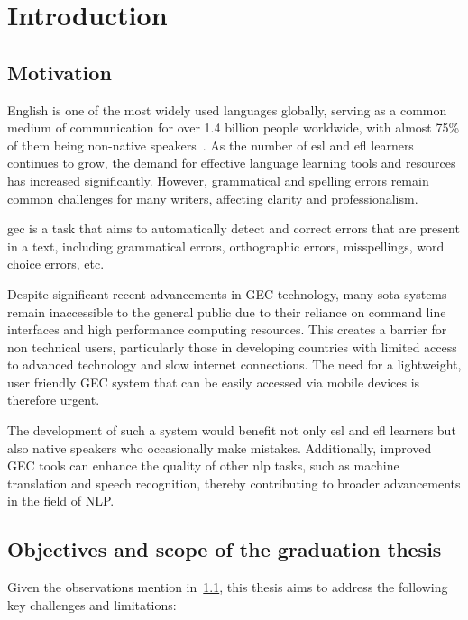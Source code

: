 \chapter{Introduction}

\section{Motivation}
\label{section:motivation}

English is one of the most widely used languages globally, serving as a common medium of communication for over 1.4 billion people worldwide, with almost 75\% of them being non-native speakers~\citep{eberhard2015ethnologue}.
As the number of \acrfull{esl} and \acrfull{efl} learners continues to grow, the demand for effective language learning tools and resources has increased significantly.
However, grammatical and spelling errors remain common challenges for many writers, affecting clarity and professionalism.

\acrfull{gec} is a task that aims to automatically detect and correct errors that are present in a text, including grammatical errors, orthographic errors, misspellings, word choice errors, etc. \citep{ng-etal-2014-conll}

Despite significant recent advancements in GEC technology, many \acrfull{sota} systems remain inaccessible to the general public due to their reliance on command line interfaces and high performance computing resources.
This creates a barrier for non technical users, particularly those in developing countries with limited access to advanced technology and slow internet connections.
The need for a lightweight, user friendly GEC system that can be easily accessed via mobile devices is therefore urgent.

The development of such a system would benefit not only \acrshort{esl} and \acrshort{efl} learners but also native speakers who occasionally make mistakes.
Additionally, improved GEC tools can enhance the quality of other \acrfull{nlp} tasks, such as machine translation and speech recognition, thereby contributing to broader advancements in the field of NLP.

\section{Objectives and scope of the graduation thesis}
\label{section:objective}
Given the observations mention in~\ref{section:motivation}, this thesis aims to address the following key challenges and limitations:

